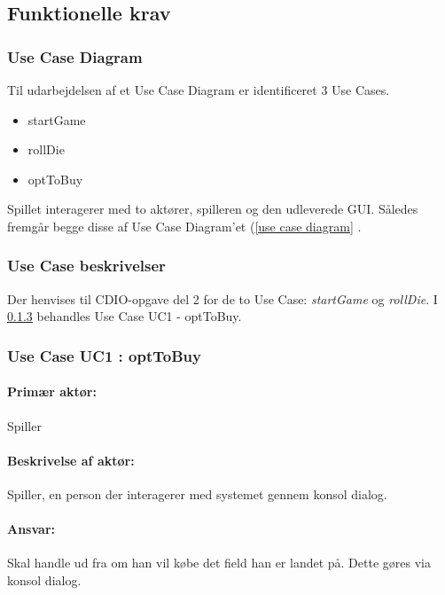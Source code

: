 \subsection{Funktionelle krav}\label{sec:krav:funkKrav}
\subsubsection{Use Case Diagram}\label{sec:krav:funkKrav:useCaseDia}
Til udarbejdelsen af et Use Case Diagram er identificeret 3 Use Cases. 

\begin{itemize}
\item startGame
\item rollDie
\item optToBuy
\end{itemize}

Spillet interagerer med to aktører, spilleren og den udleverede GUI. Således fremgår begge disse af Use Case Diagram'et (\vref{use case diagram} .

\subsubsection{Use Case beskrivelser}\label{sec:krav:funkKrav:useCaseBeskriv}
Der henvises til CDIO-opgave del 2 for de to Use Case: \textit{startGame} og \textit{rollDie}. I \ref{sec:krav:funkKrav:UC1} behandles Use Case UC1 - optToBuy.

\subsubsection{Use Case UC1 : optToBuy}\label{sec:krav:funkKrav:UC1}

\paragraph{Primær aktør:} 
Spiller

\paragraph{Beskrivelse af aktør:} 
Spiller, en person der interagerer med systemet gennem konsol dialog.

\paragraph{Ansvar:} 
Skal handle ud fra om han vil købe det field han er landet på. Dette gøres via konsol dialog.
 
